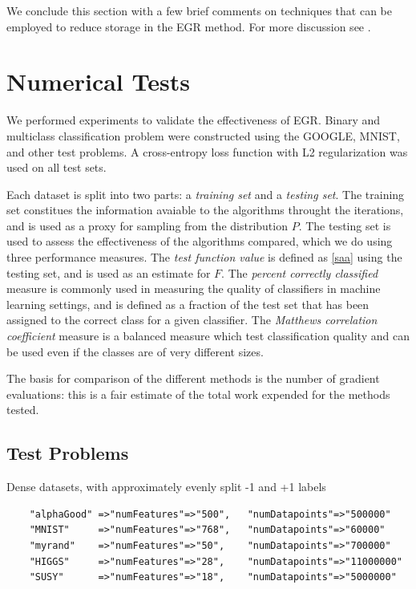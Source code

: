 \documentclass[11pt]{article}
\begin{document}
  
 We conclude this section with a few brief comments on techniques that can be employed to reduce storage in the EGR method. For more discussion see \cite{stefanThesis}.
  
  
\section{Numerical Tests} \label{numerical}
 
 We performed experiments to validate the effectiveness of EGR. Binary and multiclass classification problem were constructed using the GOOGLE, MNIST, and other test problems. A cross-entropy loss function with L2 regularization was used on all test sets.

 Each dataset is split into two parts: a \emph{training set} and a \emph{testing set}. The training set constitues the information avaiable to the algorithms throught the iterations, and is used as a proxy for sampling from the distribution $P$.  The testing set is used to assess the effectiveness of the algorithms compared, which we do using three performance measures. The \emph{test function value} is defined as \eqref{saa} using the testing set, and is used as an estimate for $F$. The \emph{percent correctly classified} measure is commonly used in measuring the quality of classifiers in machine learning settings, and is defined as a fraction of the test set that has been assigned to the correct class for a given classifier. The \emph{Matthews correlation coefficient} measure is a balanced measure which test classification quality and can be used even if the classes are of very different sizes.

 The basis for comparison of the different methods is the number of gradient evaluations: this is a fair estimate of the total work expended for the methods tested.
 
   \subsection{Test Problems}

   Dense datasets, with approximately evenly split -1 and +1 labels
   \begin{verbatim}
    "alphaGood" =>"numFeatures"=>"500",   "numDatapoints"=>"500000"
    "MNIST"     =>"numFeatures"=>"768",   "numDatapoints"=>"60000"
    "myrand"    =>"numFeatures"=>"50",    "numDatapoints"=>"700000"
    "HIGGS"     =>"numFeatures"=>"28",    "numDatapoints"=>"11000000"
    "SUSY"      =>"numFeatures"=>"18",    "numDatapoints"=>"5000000"
   \end{verbatim}
\end{document}
